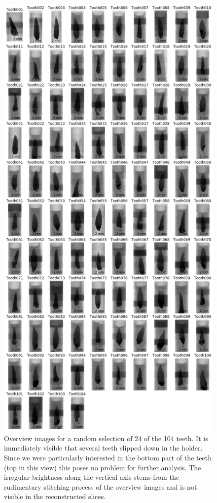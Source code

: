 \documentclass[
  american,
]{article}
\begin{document}
\begin{figure}
\hypertarget{fig:overviews}{%
\centering
\includegraphics{images/ScanOverviews.png}
\caption{Overview images for a random selection of 24 of the 104 teeth.
It is immediately visible that several teeth slipped down in the holder.
Since we were particularly interested in the bottom part of the teeth (top in this view) this poses no problem for further analysis.
The irregular brightness along the vertical axis stems from the rudimentary stitching process of the overview images and is not visible in the reconstructed slices.}\label{fig:overviews}
}
\end{figure}
\end{document}
